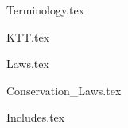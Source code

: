 \documentclass[a4paper, 12pt]{report}
\begin{document}
\author{Ginger Gengar}
\date{$1^{st}$ June 2021}
\maketitle
\newpage

\tableofcontents

\begin{center}
{Terminology.tex}
\begin{comment}
Start Level: Chapter
End Level: Chapter
Aditional Comments:
\end{comment}
{KTT.tex}
\begin{comment}
Start Level: Chapter
End Level: Chapter
Aditional Comments:
Kinematic Transport Theorem
\end{comment}
{Laws.tex}
\begin{comment}
Start Level: Chapter
End Level: Chapter
Aditional Comments:
Laws of Motions
\end{comment}
{Conservation_Laws.tex}
\begin{comment}
Start Level: Chapter
End Level: Chapter
Aditional Comments:
Conservation Laws
\end{comment}
{Includes.tex}
\begin{comment}
Start Level: Chapter
End Level: Chapter
Aditional Comments:
Rotational Dynamics
\end{comment}

\end{center}
\end{document}
